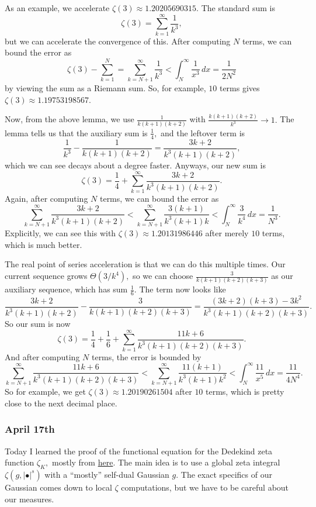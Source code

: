 As an example, we accelerate $\zeta(3)\approx1.20205690315.$ The standard sum is
\[\zeta(3)=\sum_{k=1}^\infty\frac1{k^3},\]
but we can accelerate the convergence of this. After computing $N$ terms, we can bound the error as
\[\zeta(3)-\sum_{k=1}^N=\sum_{k=N+1}^\infty\frac1{k^3}<\int_N^\infty\frac1{x^3}\,dx=\frac1{2N^2}\]
by viewing the sum as a Riemann sum. So, for example, $10$ terms gives $\zeta(3)\approx1.19753198567.$

Now, from the above lemma, we use $\frac1{k(k+1)(k+2)}$ with $\frac{k(k+1)(k+2)}{k^3}\to1.$ The lemma tells us that the auxiliary sum is $\frac14,$ and the leftover term is
\[\frac1{k^3}-\frac1{k(k+1)(k+2)}=\frac{3k+2}{k^3(k+1)(k+2)},\]
which we can see decays about a degree faster. Anyways, our new sum is
\[\zeta(3)=\frac14+\sum_{k=1}^\infty\frac{3k+2}{k^3(k+1)(k+2)}.\]
Again, after computing $N$ terms, we can bound the error as
\[\sum_{k=N+1}^\infty\frac{3k+2}{k^3(k+1)(k+2)}<\sum_{k=N+1}^\infty\frac{3(k+1)}{k^3(k+1)k}<\int_N^\infty\frac3{k^4}\,dx=\frac1{N^3}.\]
Explicitly, we can see this with $\zeta(3)\approx1.20131986446$ after merely $10$ terms, which is much better.

The real point of series acceleration is that we can do this multiple times. Our current sequence grows $\Theta\left(3/k^4\right),$ so we can choose $\frac3{k(k+1)(k+2)(k+3)}$ as our auxiliary sequence, which has sum $\frac16.$ The term now looks like
\[\frac{3k+2}{k^3(k+1)(k+2)}-\frac3{k(k+1)(k+2)(k+3)}=\frac{(3k+2)(k+3)-3k^2}{k^3(k+1)(k+2)(k+3)}.\]
So our sum is now
\[\zeta(3)=\frac14+\frac16+\sum_{k=1}^\infty\frac{11k+6}{k^3(k+1)(k+2)(k+3)}.\]
And after computing $N$ terms, the error is bounded by
\[\sum_{k=N+1}^\infty\frac{11k+6}{k^3(k+1)(k+2)(k+3)}<\sum_{k=N+1}^\infty\frac{11(k+1)}{k^3(k+1)k^2}<\int_N^\infty\frac{11}{x^5}\,dx=\frac{11}{4N^4}.\]
So for example, we get $\zeta(3)\approx1.20190261504$ after $10$ terms, which is pretty close to the next decimal place.

\subsubsection{April 17th}
Today I learned the proof of the functional equation for the Dedekind zeta function $\zeta_K,$ mostly from \href{https://web.archive.org/web/20210418222054/https://math.mit.edu/research/undergraduate/urop-plus/documents/2018/Zeff.pdf}{here}. The main idea is to use a global zeta integral $\zeta\left(g,|\bullet|^s\right)$ with a ``mostly'' self-dual Gaussian $g.$ The exact specifics of our Gaussian comes down to local $\zeta$ computations, but we have to be careful about our measures.

